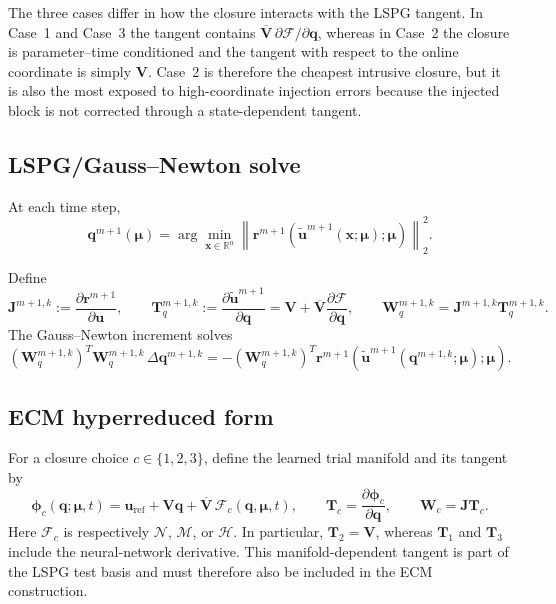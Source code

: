 \documentclass[11pt]{article}
\begin{document}
The three cases differ in how the closure interacts with the LSPG tangent. In
Case~1 and Case~3 the tangent contains
$\overline{\mathbf V}\,\partial\mathcal F/\partial\mathbf q$, whereas in
Case~2 the closure is parameter--time conditioned and the tangent with respect
to the online coordinate is simply $\mathbf V$. Case~2 is therefore the
cheapest intrusive closure, but it is also the most exposed to high-coordinate
injection errors because the injected block is not corrected through a
state-dependent tangent.

\subsection{LSPG/Gauss--Newton solve}
At each time step,
\begin{equation}
\mathbf q^{m+1}(\bm\mu)
=
\arg\min_{\mathbf x\in\mathbb R^n}
\left\|
\mathbf r^{m+1}(\tilde{\mathbf u}^{m+1}(\mathbf x;\bm\mu);\bm\mu)
\right\|_2^2.
\label{eq:ann-lspg-min}
\end{equation}

Define
\begin{equation}
\mathbf J^{m+1,k}:=\frac{\partial \mathbf r^{m+1}}{\partial \mathbf u},
\qquad
\mathbf T_q^{m+1,k}:=\frac{\partial \tilde{\mathbf u}^{m+1}}{\partial \mathbf q}
=\mathbf V+\overline{\mathbf V}\frac{\partial\mathcal F}{\partial\mathbf q},
\qquad
\mathbf W_q^{m+1,k}=\mathbf J^{m+1,k}\mathbf T_q^{m+1,k}.
\end{equation}
The Gauss--Newton increment solves
\begin{equation}
(\mathbf W_q^{m+1,k})^T\mathbf W_q^{m+1,k}\,\Delta\mathbf q^{m+1,k}
=
-(\mathbf W_q^{m+1,k})^T
\mathbf r^{m+1}(\tilde{\mathbf u}^{m+1}(\mathbf q^{m+1,k};\bm\mu);\bm\mu).
\end{equation}

\subsection{ECM hyperreduced form}
For a closure choice $c\in\{1,2,3\}$, define the learned trial manifold and
its tangent by
\begin{equation}
\boldsymbol\phi_c(\mathbf q;\bm\mu,t)
=
\mathbf u_{\mathrm{ref}}+\mathbf V\mathbf q
+\overline{\mathbf V}\,\mathcal F_c(\mathbf q,\bm\mu,t),
\qquad
\mathbf T_c
=
\frac{\partial\boldsymbol\phi_c}{\partial\mathbf q},
\qquad
\mathbf W_c=\mathbf J\mathbf T_c.
\label{eq:ann-ecm-tangent}
\end{equation}
Here $\mathcal F_c$ is respectively $\mathcal N$, $\mathcal M$, or
$\mathcal H$. In particular, $\mathbf T_2=\mathbf V$, whereas
$\mathbf T_1$ and $\mathbf T_3$ include the neural-network derivative. This
manifold-dependent tangent is part of the LSPG test basis and must therefore
also be included in the ECM construction.
\end{document}
